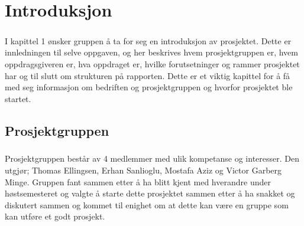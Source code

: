 \chapter{Introduksjon}
\paragraph{}I kapittel 1 ønsker gruppen å ta for seg en introduksjon av prosjektet. Dette er innledningen til selve oppgaven, og her beskrives hvem prosjektgruppen er, hvem oppdragsgiveren er, hva oppdraget er, hvilke forutsetninger og rammer prosjektet har og til slutt om strukturen på rapporten. Dette er et viktig kapittel for å få med seg informasjon om bedriften og prosjektgruppen og hvorfor prosjektet ble startet.
\section{Prosjektgruppen}
\paragraph{} Prosjektgruppen består av 4 medlemmer med ulik kompetanse og interesser. Den utgjør; Thomas Ellingsen, Erhan Sanlioglu, Mostafa Aziz og Victor Garberg Minge. Gruppen fant sammen etter å ha blitt kjent med hverandre under høstsemesteret og valgte å starte dette prosjektet sammen etter å ha snakket og diskutert sammen og kommet til enighet om at dette kan være en gruppe som kan utføre et godt prosjekt.


